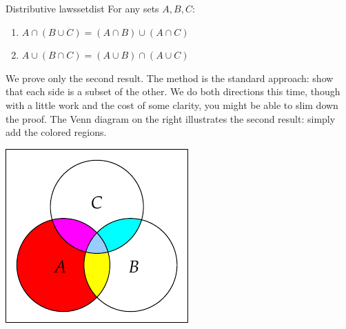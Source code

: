 \begin{minipage}[t]{0.65\linewidth}\vspace{0pt}
\begin{thm}{Distributive laws}{setdist}
For any sets $A,B,C$:
\begin{enumerate}\setlength{\itemsep}{2pt}
\item $A\cap(B\cup C)=(A\cap B)\cup(A\cap C)$
\item $A\cup(B\cap C)=(A\cup B)\cap(A\cup C)$
\end{enumerate}
\end{thm}

We prove only the second result. The method is the standard approach: show that each side is a subset of the other. We do both directions this time, though with a little work and the cost of some clarity, you might be able to slim down the proof. The Venn diagram on the right illustrates the second result: simply add the colored regions.
\end{minipage}\qquad
\begin{minipage}[t]{0.28\linewidth}\vspace{0pt}
\centering
\includegraphics[width=\textwidth]{sets-07-venndist}
\end{minipage}\par


